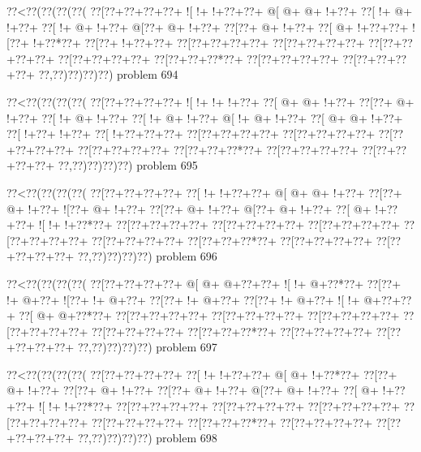 \vbox{\vbox{\goo
\0??<\0??(\0??(\0??(\0??(
\0??[\0??+\0??+\0??+\0??+
\- ![\- !+\- !+\0??+\0??+
\- @[\- @+\- @+\- !+\0??+
\0??[\- !+\- @+\- !+\0??+
\0??[\- !+\- @+\- !+\0??+
\- @[\0??+\- @+\- !+\0??+
\0??[\0??+\- @+\- !+\0??+
\0??[\- @+\- !+\0??+\0??+
\- ![\0??+\- !+\0??*\0??+
\0??[\0??+\- !+\0??+\0??+
\0??[\0??+\0??+\0??+\0??+
\0??[\0??+\0??+\0??+\0??+
\0??[\0??+\0??+\0??+\0??+
\0??[\0??+\0??+\0??+\0??+
\0??[\0??+\0??+\0??*\0??+
\0??[\0??+\0??+\0??+\0??+
\0??[\0??+\0??+\0??+\0??+
\0??,\0??)\0??)\0??)\0??)
}
\hfil problem 694\hfil\break
}

\vbox{\vbox{\goo
\0??<\0??(\0??(\0??(\0??(
\0??[\0??+\0??+\0??+\0??+
\- ![\- !+\- !+\- !+\0??+
\0??[\- @+\- @+\- !+\0??+
\0??[\0??+\- @+\- !+\0??+
\0??[\- !+\- @+\- !+\0??+
\0??[\- !+\- @+\- !+\0??+
\- @[\- !+\- @+\- !+\0??+
\0??[\- @+\- @+\- !+\0??+
\0??[\- !+\0??+\- !+\0??+
\0??[\- !+\0??+\0??+\0??+
\0??[\0??+\0??+\0??+\0??+
\0??[\0??+\0??+\0??+\0??+
\0??[\0??+\0??+\0??+\0??+
\0??[\0??+\0??+\0??+\0??+
\0??[\0??+\0??+\0??*\0??+
\0??[\0??+\0??+\0??+\0??+
\0??[\0??+\0??+\0??+\0??+
\0??,\0??)\0??)\0??)\0??)
}
\hfil problem 695\hfil\break
}

\vbox{\vbox{\goo
\0??<\0??(\0??(\0??(\0??(
\0??[\0??+\0??+\0??+\0??+
\0??[\- !+\- !+\0??+\0??+
\- @[\- @+\- @+\- !+\0??+
\0??[\0??+\- @+\- !+\0??+
\- ![\0??+\- @+\- !+\0??+
\0??[\0??+\- @+\- !+\0??+
\- @[\0??+\- @+\- !+\0??+
\0??[\- @+\- !+\0??+\0??+
\- ![\- !+\- !+\0??*\0??+
\0??[\0??+\0??+\0??+\0??+
\0??[\0??+\0??+\0??+\0??+
\0??[\0??+\0??+\0??+\0??+
\0??[\0??+\0??+\0??+\0??+
\0??[\0??+\0??+\0??+\0??+
\0??[\0??+\0??+\0??*\0??+
\0??[\0??+\0??+\0??+\0??+
\0??[\0??+\0??+\0??+\0??+
\0??,\0??)\0??)\0??)\0??)
}
\hfil problem 696\hfil\break
}

\vbox{\vbox{\goo
\0??<\0??(\0??(\0??(\0??(
\0??[\0??+\0??+\0??+\0??+
\- @[\- @+\- @+\0??+\0??+
\- ![\- !+\- @+\0??*\0??+
\0??[\0??+\- !+\- @+\0??+
\- ![\0??+\- !+\- @+\0??+
\0??[\0??+\- !+\- @+\0??+
\0??[\0??+\- !+\- @+\0??+
\- ![\- !+\- @+\0??+\0??+
\0??[\- @+\- @+\0??*\0??+
\0??[\0??+\0??+\0??+\0??+
\0??[\0??+\0??+\0??+\0??+
\0??[\0??+\0??+\0??+\0??+
\0??[\0??+\0??+\0??+\0??+
\0??[\0??+\0??+\0??+\0??+
\0??[\0??+\0??+\0??*\0??+
\0??[\0??+\0??+\0??+\0??+
\0??[\0??+\0??+\0??+\0??+
\0??,\0??)\0??)\0??)\0??)
}
\hfil problem 697\hfil\break
}

\vbox{\vbox{\goo
\0??<\0??(\0??(\0??(\0??(
\0??[\0??+\0??+\0??+\0??+
\0??[\- !+\- !+\0??+\0??+
\- @[\- @+\- !+\0??*\0??+
\0??[\0??+\- @+\- !+\0??+
\0??[\0??+\- @+\- !+\0??+
\0??[\0??+\- @+\- !+\0??+
\- @[\0??+\- @+\- !+\0??+
\0??[\- @+\- !+\0??+\0??+
\- ![\- !+\- !+\0??*\0??+
\0??[\0??+\0??+\0??+\0??+
\0??[\0??+\0??+\0??+\0??+
\0??[\0??+\0??+\0??+\0??+
\0??[\0??+\0??+\0??+\0??+
\0??[\0??+\0??+\0??+\0??+
\0??[\0??+\0??+\0??*\0??+
\0??[\0??+\0??+\0??+\0??+
\0??[\0??+\0??+\0??+\0??+
\0??,\0??)\0??)\0??)\0??)
}
\hfil problem 698\hfil\break
}


